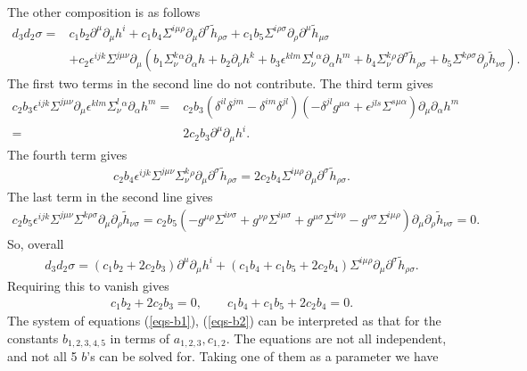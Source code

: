 \documentclass[10pt]{report}
\theoremstyle{definition}
\begin{document}
The other composition is as follows
\begin{align}
d_3 d_2 \sigma = & c_1 b_2 \partial^\mu \partial_\mu h^i + c_1 b_4 \Sigma^{i\mu\rho} \partial_\mu \partial^\sigma \tilde{h}_{\rho\sigma} + c_1 b_5 \Sigma^{i\rho\sigma} \partial_\rho \partial^\mu \tilde{h}_{\mu\sigma} \\ \nonumber \ &
+ c_2 \epsilon^{ijk} \Sigma^{j\mu\nu} \partial_\mu ( b_1 \Sigma^k_\nu{}^\alpha \partial_\alpha h + b_2 \partial_\nu h^k + b_3 \epsilon^{klm} \Sigma^l_\nu{}^\alpha \partial_\alpha h^m 
+ b_4 \Sigma^k_\nu{}^\rho \partial^\sigma \tilde{h}_{\rho\sigma} + b_5 \Sigma^{k\rho\sigma} \partial_\rho \tilde{h}_{\nu\sigma}).
\end{align}
The first two terms in the second line do not contribute. The third term gives
\begin{align}
c_2 b_3 \epsilon^{ijk} \Sigma^{j\mu\nu} \partial_\mu \epsilon^{klm} \Sigma^l_\nu{}^\alpha \partial_\alpha h^m = & c_2 b_3 (\delta^{il} \delta^{jm} - \delta^{im}\delta^{jl}) ( - \delta^{jl} g^{\mu\alpha} + \epsilon^{jls}\Sigma^{s\mu\alpha}) \partial_\mu\partial_\alpha h^m  \\ \nonumber
= & 2 c_2 b_3 \partial^\mu \partial_\mu h^i.
\end{align}
The fourth term gives
\begin{align}
c_2 b_4 \epsilon^{ijk} \Sigma^{j\mu\nu}\Sigma^k_\nu{}^\rho  \partial_\mu \partial^\sigma \tilde{h}_{\rho\sigma}= 2 c_2 b_4 \Sigma^{i\mu\rho} \partial_\mu \partial^\sigma \tilde{h}_{\rho\sigma}.
\end{align}
The last term in the second line gives
\begin{align}\nonumber
c_2 b_5  \epsilon^{ijk} \Sigma^{j\mu\nu}  \Sigma^{k\rho\sigma} \partial_\mu \partial_\rho \tilde{h}_{\nu\sigma}=c_2 b_5 (- g^{\mu\rho} \Sigma^{i\nu\sigma} + g^{\nu\rho} \Sigma^{i\mu\sigma} + g^{\mu\sigma} \Sigma^{i\nu\rho} - g^{\nu\sigma} \Sigma^{i\mu\rho}) \partial_\mu \partial_\rho \tilde{h}_{\nu\sigma}= 0.
\end{align}
So, overall
\begin{align}
d_3 d_2 \sigma = (c_1 b_2 +2 c_2 b_3) \partial^\mu \partial_\mu h^i + (c_1 b_4 + c_1 b_5 + 2 c_2 b_4)\Sigma^{i\mu\rho} \partial_\mu \partial^\sigma \tilde{h}_{\rho\sigma}.
\end{align}
Requiring this to vanish gives
\begin{align}\label{eqs-b2}
c_1 b_2 +2 c_2 b_3=0, \qquad c_1 b_4 + c_1 b_5 + 2 c_2 b_4=0.
\end{align}
The system of equations (\ref{eqs-b1}), (\ref{eqs-b2}) can be interpreted as that for the constants $b_{1,2,3,4,5}$ in terms of $a_{1,2,3}, c_{1,2}$. The equations are not all independent, and not all 5 $b$'s can be solved for. Taking one of them as a parameter we have
\end{document}
